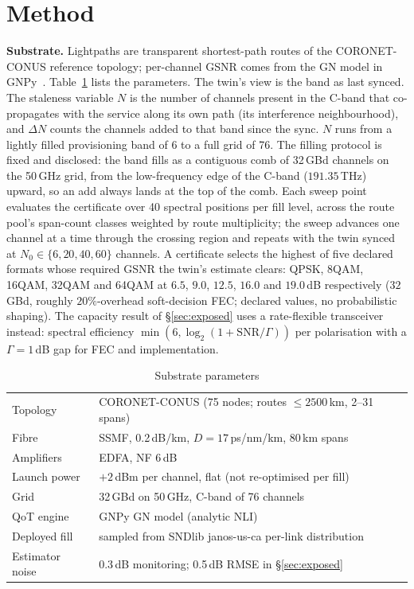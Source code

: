 \documentclass[10pt,twocolumn]{article}
\begin{document}
\section{Method}
\textbf{Substrate.} Lightpaths are transparent shortest-path routes of the
CORONET-CONUS reference topology; per-channel GSNR comes from the GN model in
GNPy~\cite{gnpy}. Table~\ref{tab:subst} lists the parameters. The twin's view is
the band as last synced. The staleness variable $N$ is the number of channels
present in the C-band that co-propagates with the service along its own path (its
interference neighbourhood), and $\Delta N$ counts the channels added to that band
since the sync. $N$ runs from a lightly filled provisioning band of 6 to a full
grid of 76. The filling protocol is fixed and disclosed: the band fills as a
contiguous comb of 32\,GBd channels on the 50\,GHz grid, from the low-frequency
edge of the C-band ($191.35$\,THz) upward, so an add always lands at the top of
the comb. Each sweep point evaluates the certificate over 40 spectral positions
per fill level, across the route pool's span-count classes weighted by route
multiplicity; the sweep advances one channel at a time through the crossing
region and repeats with the twin synced at $N_0\in\{6,20,40,60\}$ channels. A
certificate selects the highest of five declared formats whose
required GSNR the twin's estimate clears: QPSK, 8QAM, 16QAM, 32QAM and 64QAM at
$6.5$, $9.0$, $12.5$, $16.0$ and $19.0$\,dB respectively ($32$\,GBd, roughly
$20\%$-overhead soft-decision FEC; declared values, no probabilistic shaping). The
capacity result of \S\ref{sec:exposed} uses a rate-flexible transceiver instead:
spectral efficiency $\min(6,\log_2(1+\mathrm{SNR}/\Gamma))$ per polarisation with a
$\Gamma=1$\,dB gap for FEC and implementation.

\begin{table}[t]
\caption{Substrate parameters}
\label{tab:subst}
\centering
\footnotesize
\begin{tabular}{ll}
\hline
Topology & CORONET-CONUS (75 nodes; routes $\le 2500$\,km, 2--31 spans) \\
Fibre & SSMF, 0.2\,dB/km, $D=17$\,ps/nm/km, 80\,km spans \\
Amplifiers & EDFA, NF 6\,dB \\
Launch power & $+2$\,dBm per channel, flat (not re-optimised per fill) \\
Grid & 32\,GBd on 50\,GHz, C-band of 76 channels \\
QoT engine & GNPy GN model (analytic NLI) \\
Deployed fill & sampled from SNDlib janos-us-ca per-link distribution \\
Estimator noise & 0.3\,dB monitoring; 0.5\,dB RMSE in \S\ref{sec:exposed} \\
\hline
\end{tabular}
\end{table}
\end{document}
